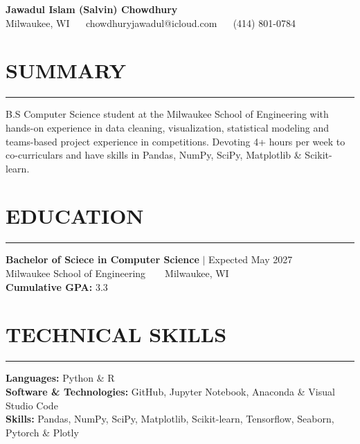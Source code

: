 \documentclass[a4paper, 11pt]{article}
\begin{document}
\begin{center}
    {\Huge \textbf{Jawadul Islam (Salvin) Chowdhury}} \\
    \vspace{0.2cm}
    {\large Milwaukee, WI ~\textbullet~ chowdhuryjawadul@icloud.com ~\textbullet~ (414) 801-0784}
\end{center}

\section*{SUMMARY}
\vspace{-0.2cm}  
\hrule
\vspace{0.2cm}
B.S Computer Science student at the Milwaukee School of Engineering with hands-on experience in data cleaning,
visualization, statistical modeling and teams-based project experience in competitions. Devoting 4+ hours per week to
co-curriculars and have skills in Pandas, NumPy, SciPy, Matplotlib \& Scikit-learn.

\section*{EDUCATION}
\vspace{-0.2cm}  
\hrule
\vspace{0.2cm}
\textbf{Bachelor of Sciece in Computer Science} \(\mid\) Expected May 2027 \\
Milwaukee School of Engineering ~ \textbullet ~ Milwaukee, WI \\
\textbf{Cumulative GPA:} 3.3

\section*{TECHNICAL SKILLS}
\vspace{-0.2cm}  
\hrule
\vspace{0.2cm}
\textbf{Languages:} Python \& R \\
\textbf{Software \& Technologies:} GitHub, Jupyter Notebook, Anaconda \& Visual Studio Code \\
\textbf{Skills:} Pandas, NumPy, SciPy, Matplotlib, Scikit-learn, Tensorflow, Seaborn, Pytorch \& Plotly
\end{document}

